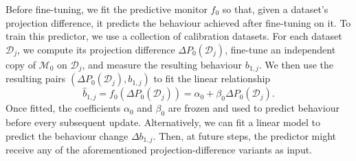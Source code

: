 Before fine-tuning, we fit the predictive monitor $f_0$ so that, given a dataset's projection difference, it predicts the behaviour achieved after fine-tuning on it. To train this predictor, we use a collection of calibration datasets. For each dataset $\mathcal{D}_j$, we compute its projection difference $\Delta P_0(\mathcal{D}_j)$, fine-tune an independent copy of $\mathcal{M}_0$ on $\mathcal{D}_j$, and measure the resulting behaviour $b_{1,j}$. We then use the resulting pairs $(\Delta P_0(\mathcal{D}_j),b_{1,j})$ to fit the linear relationship
\begin{equation}
\widehat{b}_{1,j}
=
f_0\!\left(\Delta P_0(\mathcal{D}_j)\right)
=
\alpha_0+\beta_0\Delta P_0(\mathcal{D}_j).
\label{eq:base-forecast}
\end{equation}
Once fitted, the coefficients $\alpha_0$ and $\beta_0$ are frozen and used to predict behaviour before every subsequent update. Alternatively, we can fit a linear model to predict the behaviour change $\Delta b_{1,j}$. Then, at future steps, the predictor might receive any of the aforementioned projection-difference variants as input.

